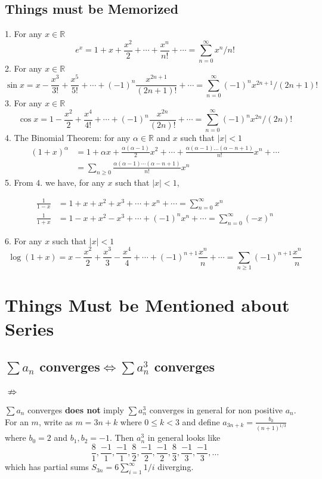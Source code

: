 \documentclass[11pt]{article}
\def\bm#1{\textbf{#1}}
\begin{document}
\subsection{Things must be Memorized}
1. For any $x \in \mathbb{R}$
$$
e^{x}=1+x+\frac{x^{2}}{2}+\cdots+\frac{x^{n}}{n !}+\cdots=\sum_{n=0}^{\infty} x^{n} / n !
$$
2. For any $x \in \mathbb{R}$
$$
\sin x=x-\frac{x^{3}}{3 !}+\frac{x^{5}}{5 !}+\cdots+(-1)^{n} \frac{x^{2 n+1}}{(2 n+1) !}+\cdots=\sum_{n=0}^{\infty}(-1)^{n} x^{2 n+1} /(2 n+1) !
$$
3. For any $x \in \mathbb{R}$
$$
\cos x=1-\frac{x^{2}}{2}+\frac{x^{4}}{4 !}+\cdots+(-1)^{n} \frac{x^{2 n}}{(2 n) !}+\cdots=\sum_{n=0}^{\infty}(-1)^{n} x^{2 n} /(2 n) !
$$
4. The Binomial Theorem: for any $\alpha \in \mathbb{R}$ and $x$ such that $|x|<1$
$$
\begin{aligned}
(1+x)^{\alpha} &=1+\alpha x+\frac{\alpha(\alpha-1)}{2} x^{2}+\cdots+\frac{\alpha(\alpha-1) \ldots(\alpha-n+1)}{n !} x^{n}+\cdots \\
&=\sum_{n \geq 0} \frac{\alpha(\alpha-1) \cdots(\alpha-n+1)}{n !} x^{n}
\end{aligned}
$$
5. From $4 .$ we have, for any $x$ such that $|x|<1$,

\begin{equation}
\begin{aligned}
\frac{1}{1-x}&=1+x+x^{2}+x^{3}+\cdots+x^{n}+\cdots=\sum_{n=0}^{\infty} x^{n} \\
\frac{1}{1+x}&=1-x+x^{2}-x^{3}+\cdots+(-1)^{n} x^{n}+\cdots=\sum_{n=0}^{\infty}(-x)^{n}
\end{aligned}
\end{equation}

6. For any $x$ such that $|x|<1$
$$
\log (1+x)=x-\frac{x^{2}}{2}+\frac{x^{3}}{3}-\frac{x^{4}}{4}+\cdots+(-1)^{n+1} \frac{x^{n}}{n}+\cdots=\sum_{n \geq 1}(-1)^{n+1} \frac{x^{n}}{n}
$$

\newpage
\section{Things Must be Mentioned about Series}
\subsection{$\sum a_n $ converges$ \iff \sum a_n^3$ converges}
\subsubsection{$\not \Rightarrow$} 
$\sum a_n$ converges \bm{does not} imply $\sum a_n^3$ converges in general for non positive $a_n$. For an $m$, write as $m=3n+k$ where $0\leq k<3$ and define $a_{3n+k}= \frac{b_k}{(n+1)^{1/3}}$ where $b_0=2$ and $b_1,b_2=-1$. Then $a^3_n$ in general looks like
$$
\frac{8}{1}, \frac{-1}{1}, \frac{-1}{1}, \frac{8}{2}, \frac{-1}{2}, \frac{-1}{2}, \frac{8}{3}, \frac{-1}{3}, \frac{-1}{3}, \ldots
$$
which has partial sums $S_{3n}=6\sum _{i=1}^{\infty} 1/i$ diverging.
\end{document}
